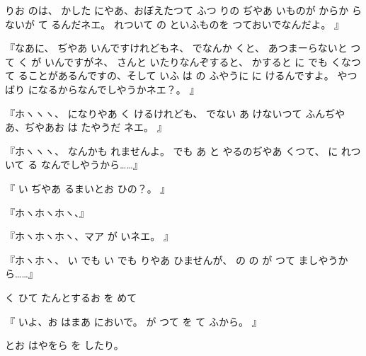 りお
のは、
かした
にやあ、おぼえたつて
ふつ
りの
ぢやあ
いものが
からか
らないが
て
るんだネエ。
れついて
の
といふものを
つておいでなんだよ。
』

『なあに、
ぢやあ
いんですけれどもネ、
でなんか
くと、
あつまーらないと
つて
く
が
いんですがネ、
さんと
いたりなんぞすると、
かすると
に
でも
くなつて
ることがあるんですの、そして
いふ
は
の
ふやうに
に
けるんですよ。
やつばり
になるからなんでしやうかネエ？。
』

『ホヽヽヽ、
になりやあ
く
けるけれども、
でない
あ
けないつて
ふんぢやあ、ぢやあお
は
たやうだ
ネエ。
』

『ホヽヽヽ、
なんかも
れませんよ。
でも
あ
と
やるのぢやあ
くつて、
に
れついて
る
なんでしやうから……』

『
い
ぢやあ
るまいとお
ひの？。
』

『ホヽホヽホヽ、』

『ホヽホヽホヽ、マア
が
いネエ。
』

『ホヽホヽ、
い
でも
い
でも
りやあ
ひませんが、
の
の
が
つて
ましやうから……』

く
ひて
たんとするお
を
めて

『
いよ、お
はまあ
においで。
が
つて
を
て
ふから。
』

とお
はやをら
を
したり。

